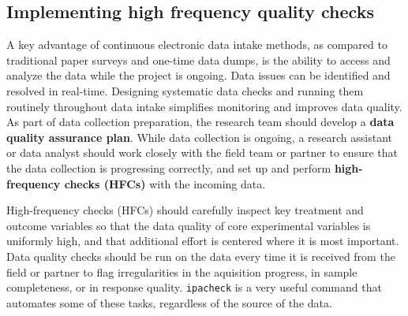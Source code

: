 \subsection{Implementing high frequency quality checks}

A key advantage of continuous electronic data intake methods,
as compared to traditional paper surveys and one-time data dumps,
is the ability to access and analyze the data while the project is ongoing.
Data issues can be identified and resolved in real-time.
Designing systematic data checks and running them routinely throughout data intake
simplifies monitoring and improves data quality.
As part of data collection preparation,
the research team should develop a \textbf{data quality assurance plan}.
While data collection is ongoing,
a research assistant or data analyst should work closely with the field team or partner
to ensure that the data collection is progressing correctly,
and set up and perform \textbf{high-frequency checks (HFCs)} with the incoming data.

High-frequency checks (HFCs) should carefully inspect key treatment and outcome variables
so that the data quality of core experimental variables is uniformly high,
and that additional effort is centered where it is most important.
Data quality checks should be run on the data every time it is received from the field or partner
to flag irregularities in the aquisition progress, in sample completeness, or in response quality.
\texttt{ipacheck}
is a very useful command that automates some of these tasks,
regardless of the source of the data.

